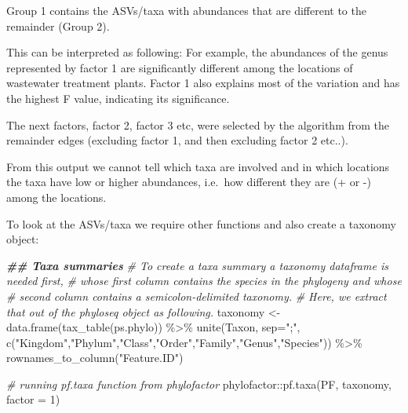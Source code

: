 \documentclass[
]{book}
\newenvironment{Shaded}{\begin{snugshade}}{\end{snugshade}}
\newcommand{\AttributeTok}[1]{\textcolor[rgb]{0.77,0.63,0.00}{#1}}
\newcommand{\CommentTok}[1]{\textcolor[rgb]{0.56,0.35,0.01}{\textit{#1}}}
\newcommand{\DecValTok}[1]{\textcolor[rgb]{0.00,0.00,0.81}{#1}}
\newcommand{\DocumentationTok}[1]{\textcolor[rgb]{0.56,0.35,0.01}{\textbf{\textit{#1}}}}
\newcommand{\FunctionTok}[1]{\textcolor[rgb]{0.00,0.00,0.00}{#1}}
\newcommand{\NormalTok}[1]{#1}
\newcommand{\OtherTok}[1]{\textcolor[rgb]{0.56,0.35,0.01}{#1}}
\newcommand{\SpecialCharTok}[1]{\textcolor[rgb]{0.00,0.00,0.00}{#1}}
\newcommand{\StringTok}[1]{\textcolor[rgb]{0.31,0.60,0.02}{#1}}
\begin{document}
Group 1 contains the ASVs/taxa with abundances that are different to the remainder (Group 2).

This can be interpreted as following: For example, the abundances of the genus represented by factor 1 are significantly different among the locations of wastewater treatment plants. Factor 1 also explains most of the variation and has the highest F value, indicating its significance.

The next factors, factor 2, factor 3 etc, were selected by the algorithm from the remainder edges (excluding factor 1, and then excluding factor 2 etc..).

From this output we cannot tell which taxa are involved and in which locations the taxa have low or higher abundances, i.e.~how different they are (+ or -) among the locations.

To look at the ASVs/taxa we require other functions and also create a taxonomy object:

\begin{Shaded}
\begin{Highlighting}[]
\DocumentationTok{\#\# Taxa summaries}
\CommentTok{\# To create a taxa summary a taxonomy dataframe is needed first, }
\CommentTok{\# whose first column contains the species in the phylogeny and whose}
\CommentTok{\# second column contains a semicolon{-}delimited taxonomy. }
\CommentTok{\# Here, we extract that out of the phyloseq object as following.}
\NormalTok{taxonomy }\OtherTok{\textless{}{-}} \FunctionTok{data.frame}\NormalTok{(}\FunctionTok{tax\_table}\NormalTok{(ps.phylo)) }\SpecialCharTok{\%\textgreater{}\%}
  \FunctionTok{unite}\NormalTok{(Taxon, }\AttributeTok{sep=}\StringTok{";"}\NormalTok{, }\FunctionTok{c}\NormalTok{(}\StringTok{"Kingdom"}\NormalTok{,}\StringTok{"Phylum"}\NormalTok{,}\StringTok{"Class"}\NormalTok{,}\StringTok{"Order"}\NormalTok{,}\StringTok{"Family"}\NormalTok{,}\StringTok{"Genus"}\NormalTok{,}\StringTok{"Species"}\NormalTok{))  }\SpecialCharTok{\%\textgreater{}\%}
  \FunctionTok{rownames\_to\_column}\NormalTok{(}\StringTok{"Feature.ID"}\NormalTok{)  }
 
\CommentTok{\# running pf.taxa function from phylofactor}
\NormalTok{phylofactor}\SpecialCharTok{::}\FunctionTok{pf.taxa}\NormalTok{(PF, taxonomy, }\AttributeTok{factor =} \DecValTok{1}\NormalTok{)}
\end{Highlighting}
\end{Shaded}
\end{document}
